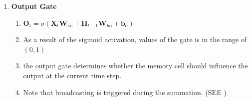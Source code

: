 \begin{enumerate}[itemsep=0.15cm]
    \item \textbf{Output Gate}
    \begin{enumerate}
        \item $\mathbf{O}_t = \sigma(\mathbf{X}_t \mathbf{W}_{\textrm{xo}} + \mathbf{H}_{t-1} \mathbf{W}_{\textrm{ho}} + \mathbf{b}_\textrm{o})$
    
        \item As a result of the sigmoid activation, values of the gate is in the range of $(0,1)$

        \item the output gate determines whether the memory cell should influence the output at the current time step.

        \item Note that broadcasting is triggered during the summation. (SEE )
    \end{enumerate}


\end{enumerate}













